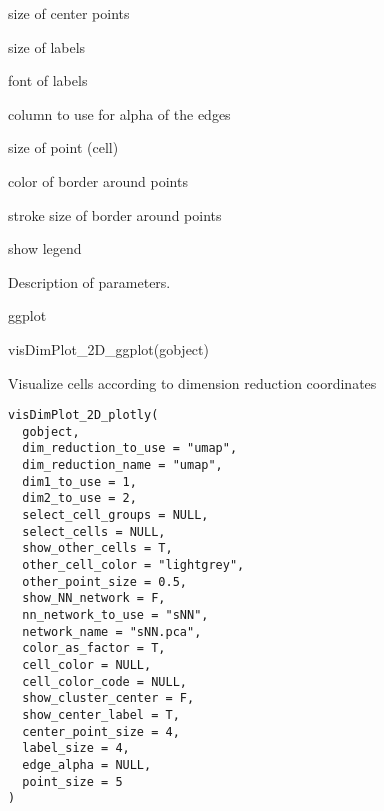 \documentclass[a4paper]{book}
\begin{document}
\begin{Arguments}
\begin{ldescription}
\item[\code{center\_point\_size}] size of center points

\item[\code{label\_size}] size of labels

\item[\code{label\_fontface}] font of labels

\item[\code{edge\_alpha}] column to use for alpha of the edges

\item[\code{point\_size}] size of point (cell)

\item[\code{point\_border\_col}] color of border around points

\item[\code{point\_border\_stroke}] stroke size of border around points

\item[\code{show\_legend}] show legend
\end{ldescription}
\end{Arguments}
%
\begin{Details}\relax
Description of parameters.
\end{Details}
%
\begin{Value}
ggplot
\end{Value}
%
\begin{Examples}
\begin{ExampleCode}
    visDimPlot_2D_ggplot(gobject)
\end{ExampleCode}
\end{Examples}
%
\begin{Description}\relax
Visualize cells according to dimension reduction coordinates
\end{Description}
%
\begin{Usage}
\begin{verbatim}
visDimPlot_2D_plotly(
  gobject,
  dim_reduction_to_use = "umap",
  dim_reduction_name = "umap",
  dim1_to_use = 1,
  dim2_to_use = 2,
  select_cell_groups = NULL,
  select_cells = NULL,
  show_other_cells = T,
  other_cell_color = "lightgrey",
  other_point_size = 0.5,
  show_NN_network = F,
  nn_network_to_use = "sNN",
  network_name = "sNN.pca",
  color_as_factor = T,
  cell_color = NULL,
  cell_color_code = NULL,
  show_cluster_center = F,
  show_center_label = T,
  center_point_size = 4,
  label_size = 4,
  edge_alpha = NULL,
  point_size = 5
)
\end{verbatim}
\end{Usage}
\end{document}
